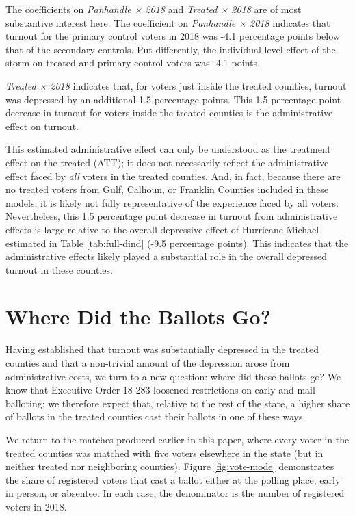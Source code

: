 \documentclass[
  12pt,
]{article}
\begin{document}
The coefficients on \emph{Panhandle × 2018} and \emph{Treated × 2018} are of most substantive interest here. The coefficient on \emph{Panhandle × 2018} indicates that turnout for the primary control voters in 2018 was -4.1 percentage points below that of the secondary controls. Put differently, the individual-level effect of the storm on treated and primary control voters was -4.1 points.

\emph{Treated × 2018} indicates that, for voters just inside the treated counties, turnout was depressed by an additional 1.5 percentage points. This 1.5 percentage point decrease in turnout for voters inside the treated counties is the administrative effect on turnout.

This estimated administrative effect can only be understood as the treatment effect on the treated (ATT); it does not necessarily reflect the administrative effect faced by \emph{all} voters in the treated counties. And, in fact, because there are no treated voters from Gulf, Calhoun, or Franklin Counties included in these models, it is likely not fully representative of the experience faced by all voters. Nevertheless, this 1.5 percentage point decrease in turnout from administrative effects is large relative to the overall depressive effect of Hurricane Michael estimated in Table \ref{tab:full-dind} (-9.5 percentage points). This indicates that the administrative effects likely played a substantial role in the overall depressed turnout in these counties.

\hypertarget{where-did-the-ballots-go}{%
\section*{Where Did the Ballots Go?}\label{where-did-the-ballots-go}}

Having established that turnout was substantially depressed in the treated counties and that a non-trivial amount of the depression arose from administrative costs, we turn to a new question: where did these ballots go? We know that Executive Order 18-283 loosened restrictions on early and mail balloting; we therefore expect that, relative to the rest of the state, a higher share of ballots in the treated counties cast their ballots in one of these ways.

We return to the matches produced earlier in this paper, where every voter in the treated counties was matched with five voters elsewhere in the state (but in neither treated nor neighboring counties). Figure \ref{fig:vote-mode} demonstrates the share of registered voters that cast a ballot either at the polling place, early in person, or absentee. In each case, the denominator is the number of registered voters in 2018.
\end{document}
